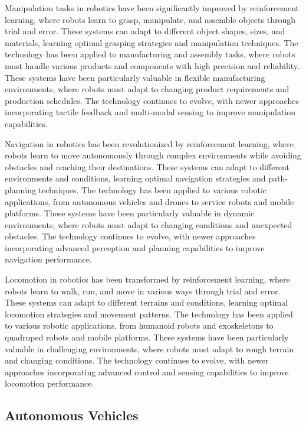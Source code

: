 Manipulation tasks in robotics have been significantly improved by reinforcement learning, where robots learn to grasp, manipulate, and assemble objects through trial and error. These systems can adapt to different object shapes, sizes, and materials, learning optimal grasping strategies and manipulation techniques. The technology has been applied to manufacturing and assembly tasks, where robots must handle various products and components with high precision and reliability. These systems have been particularly valuable in flexible manufacturing environments, where robots must adapt to changing product requirements and production schedules. The technology continues to evolve, with newer approaches incorporating tactile feedback and multi-modal sensing to improve manipulation capabilities.

Navigation in robotics has been revolutionized by reinforcement learning, where robots learn to move autonomously through complex environments while avoiding obstacles and reaching their destinations. These systems can adapt to different environments and conditions, learning optimal navigation strategies and path-planning techniques. The technology has been applied to various robotic applications, from autonomous vehicles and drones to service robots and mobile platforms. These systems have been particularly valuable in dynamic environments, where robots must adapt to changing conditions and unexpected obstacles. The technology continues to evolve, with newer approaches incorporating advanced perception and planning capabilities to improve navigation performance.

Locomotion in robotics has been transformed by reinforcement learning, where robots learn to walk, run, and move in various ways through trial and error. These systems can adapt to different terrains and conditions, learning optimal locomotion strategies and movement patterns. The technology has been applied to various robotic applications, from humanoid robots and exoskeletons to quadruped robots and mobile platforms. These systems have been particularly valuable in challenging environments, where robots must adapt to rough terrain and changing conditions. The technology continues to evolve, with newer approaches incorporating advanced control and sensing capabilities to improve locomotion performance.

\subsection{Autonomous Vehicles}

